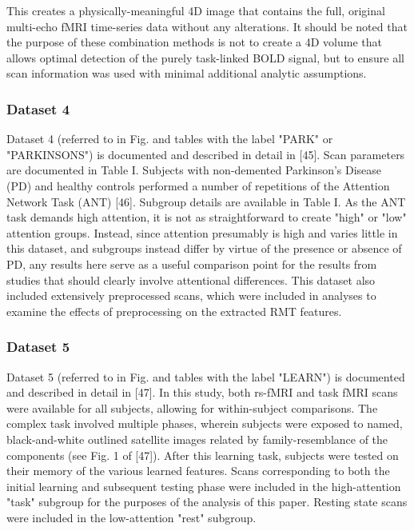 This creates a physically-meaningful 4D
image that contains the full, original multi-echo fMRI time-series data without any alterations. It
should be noted that the purpose of these combination methods is not to create a 4D volume that
allows optimal detection of the purely task-linked BOLD signal, but to ensure all scan information
was used with minimal additional analytic assumptions.

\subsubsection{Dataset 4}
Dataset 4 (referred to in Fig. and tables with the label "PARK" or "PARKINSONS") is documented and
described in detail in [45]. Scan parameters are documented in Table I. Subjects with non-demented
Parkinson’s Disease (PD) and healthy controls performed a number of repetitions of the Attention
Network Task (ANT) [46]. Subgroup details are available in Table I. As the ANT task demands high
attention, it is not as straightforward to create "high" or "low" attention groups. Instead, since
attention presumably is high and varies little in this dataset, and subgroups instead differ by
virtue of the presence or absence of PD, any results here serve as a useful comparison point for the
results from studies that should clearly involve attentional differences. This dataset also included
extensively preprocessed scans, which were included in analyses to examine the effects of
preprocessing on the extracted RMT features.

\subsubsection{Dataset 5}
Dataset 5 (referred to in Fig. and tables with the label "LEARN") is documented and described in
detail in [47]. In this study, both rs-fMRI and task fMRI scans were available for all subjects,
allowing for within-subject comparisons. The complex task involved multiple phases, wherein subjects
were exposed to named, black-and-white outlined satellite images related by family-resemblance of
the components (see Fig. 1 of [47]). After this learning task, subjects were tested on their memory
of the various learned features. Scans corresponding to both the initial learning and subsequent
testing phase were included in the high-attention "task" subgroup for the purposes of the analysis
of this paper. Resting state scans were included in the low-attention "rest" subgroup.

